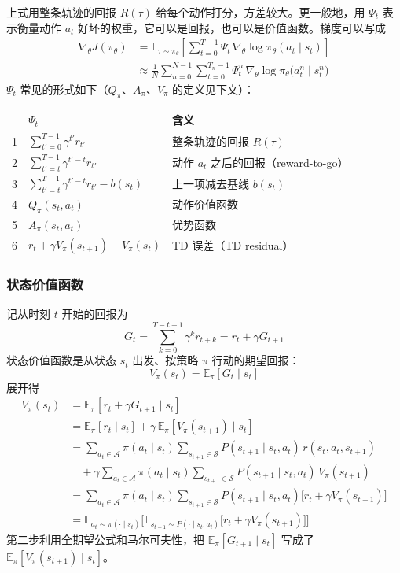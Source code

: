 \documentclass[UTF8,fontset=fandol]{ctexart}
\begin{document}
上式用整条轨迹的回报 $R(\tau)$ 给每个动作打分，方差较大。更一般地，用 $\Psi_t$ 表示衡量动作 $a_t$ 好坏的权重，它可以是回报，也可以是价值函数。梯度可以写成
\begin{align*}
\nabla_\theta J(\pi_\theta)
&=\mathbb{E}_{\tau\sim\pi_\theta}\left[\sum_{t=0}^{T-1}\Psi_t\,\nabla_\theta\log\pi_\theta(a_t\mid s_t)\right]\\
&\approx\frac{1}{N}\sum_{n=0}^{N-1}\sum_{t=0}^{T_n-1}\Psi_t^{n}\,\nabla_\theta\log\pi_\theta\big(a_t^{n}\mid s_t^{n}\big)
\end{align*}
$\Psi_t$ 常见的形式如下（$Q_\pi$、$A_\pi$、$V_\pi$ 的定义见下文）：
\begin{center}
\renewcommand{\arraystretch}{1.4}
\begin{tabular}{cll}
\hline
 & $\Psi_t$ & 含义\\
\hline
1 & $\sum_{t'=0}^{T-1}\gamma^{t'}r_{t'}$ & 整条轨迹的回报 $R(\tau)$\\
2 & $\sum_{t'=t}^{T-1}\gamma^{t'-t}r_{t'}$ & 动作 $a_t$ 之后的回报（reward-to-go）\\
3 & $\sum_{t'=t}^{T-1}\gamma^{t'-t}r_{t'}-b(s_t)$ & 上一项减去基线 $b(s_t)$\\
4 & $Q_\pi(s_t,a_t)$ & 动作价值函数\\
5 & $A_\pi(s_t,a_t)$ & 优势函数\\
6 & $r_t+\gamma V_\pi(s_{t+1})-V_\pi(s_t)$ & TD 误差（TD residual）\\
\hline
\end{tabular}
\end{center}

\subsubsection{状态价值函数}

记从时刻 $t$ 开始的回报为
\[
G_t=\sum_{k=0}^{T-t-1}\gamma^k r_{t+k}=r_t+\gamma G_{t+1}
\]
状态价值函数是从状态 $s_t$ 出发、按策略 $\pi$ 行动的期望回报：
\[
V_\pi(s_t)=\mathbb{E}_\pi\left[G_t\mid s_t\right]
\]
展开得
\begin{align*}
V_\pi(s_t)
&=\mathbb{E}_\pi\left[r_t+\gamma G_{t+1}\mid s_t\right]\\
&=\mathbb{E}_\pi\left[r_t\mid s_t\right]+\gamma\,\mathbb{E}_\pi\left[V_\pi(s_{t+1})\mid s_t\right]\\
&=\sum_{a_t\in\mathcal{A}}\pi(a_t\mid s_t)\sum_{s_{t+1}\in\mathcal{S}}P(s_{t+1}\mid s_t,a_t)\,r(s_t,a_t,s_{t+1})\\
&\quad+\gamma\sum_{a_t\in\mathcal{A}}\pi(a_t\mid s_t)\sum_{s_{t+1}\in\mathcal{S}}P(s_{t+1}\mid s_t,a_t)\,V_\pi(s_{t+1})\\
&=\sum_{a_t\in\mathcal{A}}\pi(a_t\mid s_t)\sum_{s_{t+1}\in\mathcal{S}}P(s_{t+1}\mid s_t,a_t)\big[r_t+\gamma V_\pi(s_{t+1})\big]\\
&=\mathbb{E}_{a_t\sim\pi(\cdot\mid s_t)}\Big[\mathbb{E}_{s_{t+1}\sim P(\cdot\mid s_t,a_t)}\big[r_t+\gamma V_\pi(s_{t+1})\big]\Big]
\end{align*}
第二步利用全期望公式和马尔可夫性，把 $\mathbb{E}_\pi\left[G_{t+1}\mid s_t\right]$ 写成了 $\mathbb{E}_\pi\left[V_\pi(s_{t+1})\mid s_t\right]$。
\end{document}
